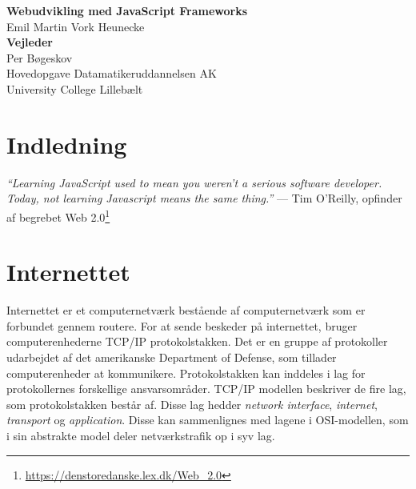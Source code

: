 \documentclass[]{article}
\author{}
\date{\vspace{-2.5em}}
\renewcommand{\contentsname}{Indhold}
\begin{document}
\onehalfspacing
{}

\begin{center}
\vspace*{8\baselineskip}
\LARGE{\textbf{Webudvikling med JavaScript Frameworks}}\\
\vspace*{1\baselineskip}
\Large{Emil Martin Vork Heunecke}\\
\vspace*{3\baselineskip}
\Large{\textbf{Vejleder}}\\
Per Bøgeskov\\
\vspace*{2\baselineskip}
Hovedopgave Datamatikeruddannelsen AK\\
University College Lillebælt\\
\end{center}

\doublespacing

\hypersetup{linkcolor = black}
\newpage
{}
\tableofcontents
\addcontentsline{toc}{section}{\contentsname}

\newpage

\listoffigures 

\newpage
\listoftables

\doublespacing

\newpage
{}
\hypersetup{linkcolor = blue}

\hypertarget{indledning}{%
\section{Indledning}\label{indledning}}

\emph{``Learning JavaScript used to mean you weren't a serious software
developer. Today, not learning Javascript means the same thing.''} ---
Tim O'Reilly, opfinder af begrebet Web 2.0\footnote{\url{https://denstoredanske.lex.dk/Web_2.0}}

\hypertarget{internettet}{%
\section{Internettet}\label{internettet}}

Internettet er et computernetværk bestående af computernetværk som er
forbundet gennem routere. For at sende beskeder på internettet, bruger
computerenhederne TCP/IP protokolstakken. Det er en gruppe af
protokoller udarbejdet af det amerikanske Department of Defense, som
tillader computerenheder at kommunikere. Protokolstakken kan inddeles i
lag for protokollernes forskellige ansvarsområder. TCP/IP modellen
beskriver de fire lag, som protokolstakken består af. Disse lag hedder
\emph{network interface}, \emph{internet}, \emph{transport} og
\emph{application}. Disse kan sammenlignes med lagene i OSI-modellen,
som i sin abstrakte model deler netværkstrafik op i syv lag.
\end{document}
